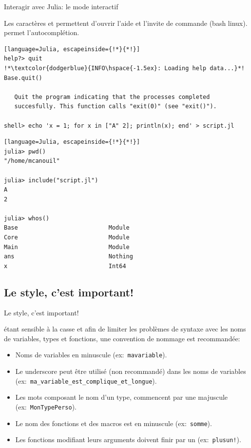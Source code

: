 \begin{frame}[containsverbatim]{Interagir avec Julia: le mode interactif}
\par{Les caractères  et \cmdb{;} permettent d'ouvrir l'aide et l'invite de commande (bash linux). {\Julia} permet l'autocomplétion.}
\begin{lstlisting}[language=Julia, escapeinside={!*}{*!}]
help?> quit
!*\textcolor{dodgerblue}{INFO\hspace{-1.5ex}: Loading help data...}*!
Base.quit()

   Quit the program indicating that the processes completed
   succesfully. This function calls "exit(0)" (see "exit()").

shell> echo 'x = 1; for x in ["A" 2]; println(x); end' > script.jl
\end{lstlisting}
\vspace{-2ex}
\begin{lstlisting}[language=Julia, escapeinside={!*}{*!}]
julia> pwd()
"/home/mcanouil"

julia> include("script.jl")
A
2

julia> whos()
Base                          Module
Core                          Module
Main                          Module
ans                           Nothing
x                             Int64
\end{lstlisting}
\end{frame}


\subsection{Le style, c'est important!}
\begin{frame}{Le style, c'est important!}
\par{{\Julia} étant sensible à la casse et afin de limiter les problèmes de syntaxe avec les noms de variables, types et fonctions, une convention de nommage est recommandée:}
\begin{itemize}
    \item Noms de variables en  minuscule (ex:~\texttt{mavariable}).
    \item Le underscore \cmdb{\_} peut être utilisé (non recommandé) dans les noms de variables (ex:~\texttt{ma\_variable\_est\_complique\_et\_longue}).
    \item Les mots composant le nom d'un type, commencent par une majuscule (ex:~\texttt{MonTypePerso}).
    \item Le nom des fonctions et des macros est en minuscule (ex:~\texttt{somme}).
    \item Les fonctions modifiant leurs arguments doivent finir par un \cmdb{\hspace{-0.5ex}!} (ex:~\texttt{plusun\hspace{-0.5ex}!}).
\end{itemize}
\end{frame}


